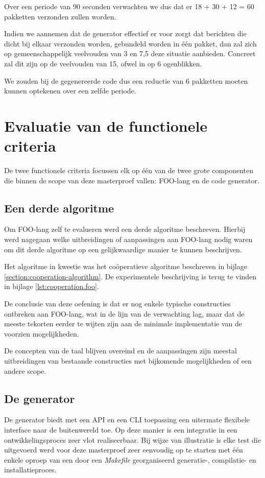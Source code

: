 Over een periode van 90 seconden verwachten we dus dat er 18 + 30 + 12 = 60
pakketten verzonden zullen worden.

Indien we aannemen dat de generator effectief er voor zorgt dat berichten die
dicht bij elkaar verzonden worden, gebundeld worden in \'e\'en pakket, dan zal
zich op gemeenschappelijk veelvouden van 3 en 7,5 deze situatie aanbieden.
Concreet zal dit zijn op de veelvouden van 15, ofwel in op 6 ogenblikken.

We zouden bij de gegenereerde code dus een reductie van 6 pakketten moeten
kunnen optekenen over een zelfde periode.

\section{Evaluatie van de functionele criteria}

De twee functionele criteria focussen elk op \'e\'en van de twee grote
componenten die binnen de scope van deze masterproef vallen: FOO-lang en de
code generator.

\subsection{Een derde algoritme}

Om FOO-lang zelf te evalueren werd een derde algoritme beschreven. Hierbij werd
nagegaan welke uitbreidingen of aanpassingen aan FOO-lang nodig waren om dit
derde algoritme op een gelijkwaardige manier te kunnen beschrijven.

Het algoritme in kwestie was het co\"operatieve algoritme beschreven in bijlage
\ref{section:cooperation-algorithm}. De experimentele beschrijving is terug te
vinden in bijlage \ref{lst:cooperation.foo}.

De conclusie van deze oefening is dat er nog enkele typische constructies
ontbreken aan FOO-lang, wat in de lijn van de verwachting lag, maar dat de
meeste tekorten eerder te wijten zijn aan de minimale implementatie van de
voorzien mogelijkheden.

De concepten van de taal blijven overeind en de aanpassingen zijn meestal
uitbreidingen van bestaande constructies met bijkomende mogelijkheden of een
andere scope.

\subsection{De generator}

De generator biedt met een API en een CLI toepassing een uitermate flexibele
interface naar de buitenwereld toe. Op deze manier is een integratie in een
ontwikkelingsproces zeer vlot realiseerbaar. Bij wijze van illustratie is elke
test die uitgevoerd werd voor deze masterproef zeer eenvoudig op te starten met
\'e\'en enkele oproep van een door een \emph{Makefile} georganiseerd
generatie-, compilatie- en installatieproces.

